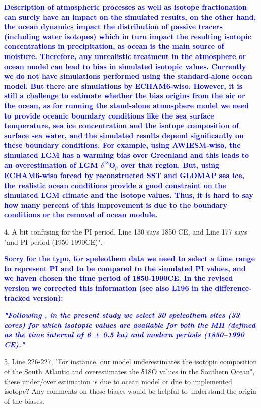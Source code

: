 \documentclass[gmd, manuscript]{copernicus}
\begin{document}
\medskip

\textcolor{blue}{\textbf{Description of atmospheric processes as well as isotope fractionation can surely have an impact on the simulated results, on the other hand,  the ocean dynamics impact the distribution of passive tracers (including water isotopes) which in turn impact the resulting isotopic concentrations in precipitation, as ocean is the main source of moisture. Therefore, any unrealistic treatment in the atmosphere or ocean model can lead to bias in simulated isotopic values. Currently we do not have simulations performed using the standard-alone ocean model. But there are simulations by ECHAM6-wiso. However, it is still a challenge to estimate whether the bias origins from the air or the ocean, as for running the stand-alone atmosphere model we need to provide oceanic boundary conditions like the sea surface temperature, sea ice concentration and the isotope composition of surface sea water, and the simulated results depend significantly on these boundary conditions. For example, using AWIESM-wiso, the simulated LGM has a warming bias over Greenland and this leads to an overestimation of LGM $\delta^{18}$O$_p$ over that region. But, using ECHAM6-wiso forced by reconstructed SST and GLOMAP sea ice, the realistic ocean conditions provide a good constraint on the simulated LGM climate and the isotope values. Thus, it is hard to say how many percent of this improvement is due to the boundary conditions or the removal of ocean module.}}

\medskip


4. A bit confusing for the PI period, Line 130 says 1850 CE, and Line 177 says "and PI period (1950-1990CE)".

\medskip

\textcolor{blue}{\textbf{Sorry for the typo, for speleothem data we need to select a time range to represent PI and to be compared to the simulated PI values, and we haven chosen the time period of 1850-1990CE. In the revised version we corrected this information (see also L196 in the difference-tracked version):}}

\textcolor{blue}{\textbf{\textit{"Following  \citet{comas2019evaluating}, in the present study we select 30 speleothem sites (33 cores) for which isotopic values are available for both the MH (defined as the time interval of 6 ± 0.5 ka) and modern periods (1850–1990 CE)."}}}

\medskip

5. Line 226-227, "For instance, our model underestimates the isotopic composition of the South Atlantic and overestimates the δ18O values in the Southern Ocean", these under/over estimation is due to ocean model or due to implemented isotope? Any comments on these biases would be helpful to understand the origin of the biases.
\end{document}
